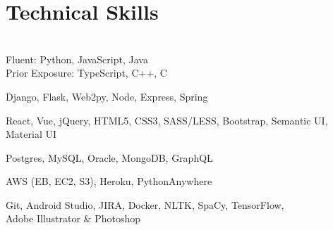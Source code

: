 \documentclass[]{hieudo-build}
\begin{document}
\hfill
\begin{minipage}[t]{0.3\textwidth} 

\section{Technical Skills}
\begin{flushleft}
\narrower
{} 
\smallskip \\
\normalsize
  Fluent: Python, JavaScript, Java \\
  Prior Exposure: TypeScript, C++, C
\sectionsep

\normalsize
  Django, Flask, Web2py, Node, Express, Spring
\sectionsep

\normalsize
  React, Vue,
  jQuery, HTML5, CSS3, SASS/LESS, Bootstrap, Semantic UI, Material UI
\sectionsep

\normalsize
  Postgres, MySQL, Oracle, MongoDB, GraphQL
\sectionsep

\normalsize
  AWS (EB, EC2, S3), Heroku, PythonAnywhere
\sectionsep

\normalsize
  Git, Android Studio, JIRA, Docker, NLTK, SpaCy, TensorFlow, 
  \\
  Adobe Illustrator \& Photoshop
\end{flushleft}





\end{minipage}
\end{document}
